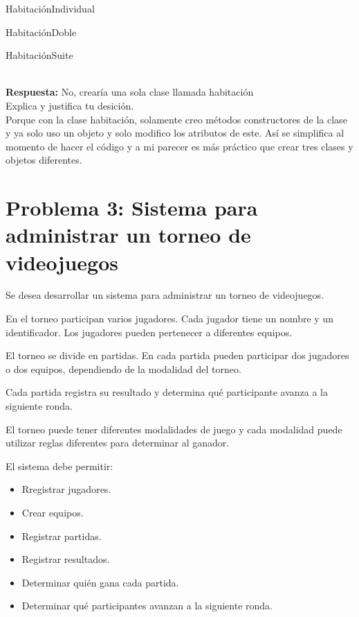 \documentclass[12pt]{article}
\begin{document}
{
\raggedright
HabitaciónIndividual

HabitaciónDoble

HabitaciónSuite
} \\

\textbf{Respuesta:}
 No, crearía una sola clase llamada habitación \\

Explica y justifica tu desición. \\

Porque con la clase habitación, solamente creo métodos constructores de la clase y ya solo uso un objeto y solo modifico los atributos de este. Así se simplifica al momento de hacer el código y a mi parecer es más práctico que crear tres clases y objetos diferentes.

\vspace{1cm}

\section*{Problema 3: Sistema para administrar un torneo de videojuegos}
Se desea desarrollar un sistema para administrar un torneo de videojuegos.

En el torneo participan varios jugadores. Cada jugador tiene un nombre y un identificador. Los jugadores pueden pertenecer a diferentes equipos.

El torneo se divide en partidas. En cada partida pueden participar dos jugadores o dos equipos, dependiendo de la modalidad del torneo.

Cada partida registra su resultado y determina qué participante avanza a la siguiente ronda.

El torneo puede tener diferentes modalidades de juego y cada modalidad puede utilizar reglas diferentes para determinar al ganador.

El sistema debe permitir:

\begin{itemize}
  \item Rregistrar jugadores.
  \item Crear equipos.
  \item Registrar partidas.
  \item Registrar resultados.
  \item Determinar quién gana cada partida.
  \item Determinar qué participantes avanzan a la siguiente ronda.
\end{itemize}
\end{document}

